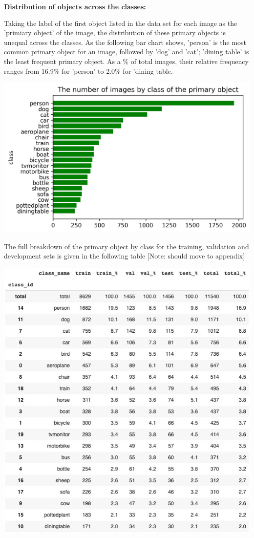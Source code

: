 \documentclass{article}
\begin{document}
\textbf{Distribution of objects across the classes:}

Taking the label of the first object listed in the data set for each image as the 'primiary object' of the image, the distribution of these primary objects is unequal across the classes. As the following bar chart shows, 'person' is the most common primary object for an image, followed by 'dog' and 'cat'; 'dining table' is the least frequent primary object. As a \% of total images, their relative frequency ranges from 16.9\% for 'person' to 2.0\% for 'dining table.

\includegraphics[scale = 0.7]{bar_channels.jpg}

The full breakdown of the primary object by class for the training, validation and development sets is given in the following table [Note: should move to appendix]

\includegraphics[scale = 0.5]{table_channels.jpg}
\end{document}
